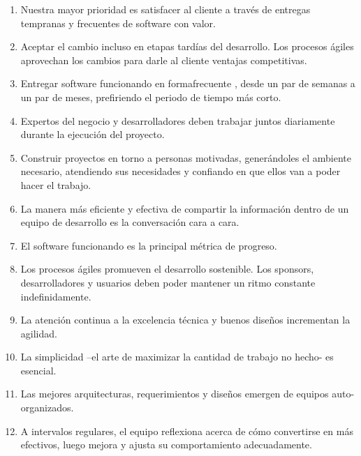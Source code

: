\begin{enumerate}[]
	\item   Nuestra mayor prioridad es satisfacer al cliente a través 
	de   entregas     tempranas      y  frecuentes     de   software    con 
	valor.

	\item  Aceptar       el   cambio      incluso     en   etapas     tardías    del 
	desarrollo.   Los   procesos   ágiles   aprovechan   los   cambios 
	para darle al cliente ventajas competitivas.
	\item  Entregar software funcionando en formafrecuente , desde 
	un   par   de   semanas   a   un   par   de   meses,   prefiriendo   el 
	periodo de tiempo más corto.
	\item   Expertos     del   negocio    y  desarrolladores      deben    trabajar 
	juntos diariamente durante la ejecución del proyecto.
	\item   Construir      proyectos     en   torno    a  personas     motivadas, 
	generándoles       el   ambiente      necesario,     atendiendo      sus 
	necesidades y confiando en que ellos van a poder hacer 
	el trabajo.
	\item  La    manera     más    eficiente   y   efectiva    de  compartir      la 
	información       dentro   de   un   equipo    de   desarrollo    es   la 
	conversación cara a cara.
	\item  El   software      funcionando      es   la   principal    métrica    de 
	progreso.
	\item  Los procesos ágiles promueven el desarrollo sostenible. 
	Los     sponsors,    desarrolladores      y  usuarios    deben    poder 
	mantener un ritmo constante indefinidamente.
	\item  La   atención   continua   a   la   excelencia   técnica   y   buenos 
	diseños incrementan la agilidad.
	\item  La   simplicidad    –el    arte  de   maximizar      la  cantidad    de 
	trabajo no hecho- es esencial.
	\item  Las    mejores     arquitecturas,     requerimientos       y   diseños 
	emergen de equipos auto-organizados.
	\item  A   intervalos   regulares,   el   equipo   reflexiona   acerca   de 
	cómo convertirse en más efectivos, luego mejora y ajusta 
	su comportamiento adecuadamente.
\end{enumerate}

